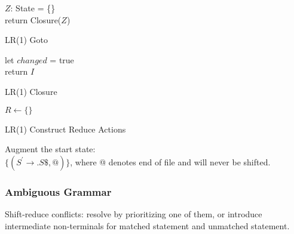 \documentclass[8pt]{extarticle}
\begin{document}
\begin{multicols*}{2}
  \begin{algorithm}[H]
    $Z$: State = \{\}\\
    return Closure($Z$)
    \caption{LR(1) Goto\label{Algo_goto_lr1}}
  \end{algorithm}

  \begin{algorithm}[H]
    let $changed$ = true\\
    return $I$
    \caption{LR(1) Closure\label{Algo_closure_lr1}}
  \end{algorithm}

  \begin{algorithm}[H]
    $R \leftarrow \{\}$\\
    \caption{LR(1) Construct Reduce Actions\label{Algo_reduce_lr1}}
  \end{algorithm}

  Augment the start state:\\
  $\{(S^{\prime} \rightarrow . S \$, @)\}$, where @ denotes end of file and will never be shifted.

  \subsubsection{Ambiguous Grammar}
  Shift-reduce conflicts: resolve by prioritizing one of them, or introduce intermediate non-terminals for matched statement and unmatched statement.


\end{multicols*}
\end{document}
